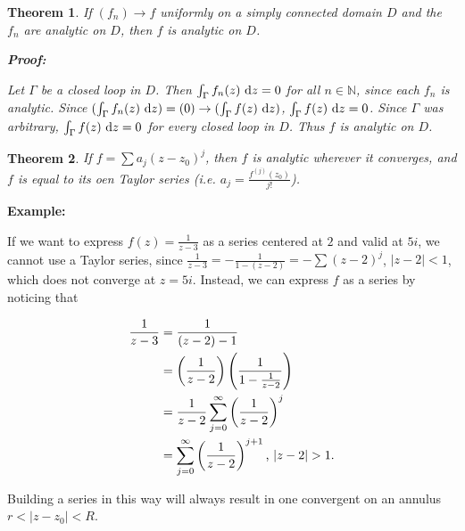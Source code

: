 \documentclass{article}
\theoremstyle{colontheorem}
\newtheorem{theorem}{Theorem}[section]
\newenvironment{Theorem}
{
	\begin{mdframed}[backgroundcolor=TheoremOrange!10]
	\begin{theorem}
}
{
	\end{theorem}
	\end{mdframed}
	
	\vspace{.15in}
}
\newenvironment{Proof}
{
	\begin{mdframed}[backgroundcolor=ProofPurple!10]
	\textbf{Proof:}%
}
{
	\end{mdframed}
	
	\vspace{.085in}
}
\newenvironment{Example}
{
	\begin{mdframed}
	\textbf{Example:}%
}
{
	\end{mdframed}
	
	\vspace{.15in}
}
\begin{document}
\begin{Theorem}
	
	If $(f_n) \to f$ uniformly on a simply connected domain $D$ and the $f_n$ are analytic on $D$, then $f$ is analytic on $D$.
	
	\begin{Proof}
		Let $\Gamma$ be a closed loop in $D$. Then $\int_{\Gamma} f_n(z)\ \textnormal{d}z = 0$ for all $n \in \mathbb{N}$, since each $f_n$ is analytic. Since $(\int_{\Gamma} f_n(z)\ \textnormal{d}z) = (0) \to (\int_{\Gamma} f(z)\ \textnormal{d}z)$, $\int_{\Gamma} f(z)\ \textnormal{d}z = 0$. Since $\Gamma$ was arbitrary, $\int_{\Gamma} f(z)\ \textnormal{d}z = 0$ for every closed loop in $D$. Thus $f$ is analytic on $D$.
		
	\end{Proof}
	
\end{Theorem}



\begin{Theorem}
	
	If $f = \displaystyle\sum a_j (z - z_0)^j$, then $f$ is analytic wherever it converges, and $f$ is equal to its oen Taylor series (i.e. $a_j = \frac{f^{(j)}(z_0)}{j!}$).
	
\end{Theorem}



\begin{Example}
	If we want to express $f(z) = \frac{1}{z-3}$ as a series centered at $2$ and valid at $5i$, we cannot use a Taylor series, since $\frac{1}{z-3} = -\frac{1}{1 - (z-2)} = - \displaystyle\sum (z - 2)^j$, $|z-2| < 1$, which does not converge at $z = 5i$. Instead, we can express $f$ as a series by noticing that
	
	\begin{align*}
		\frac{1}{z-3} &= \frac{1}{(z-2) - 1}\\
		&= \left( \frac{1}{z-2} \right) \left( \frac{1}{1 - \frac{1}{z-2}} \right)\\
		&= \frac{1}{z-2} \sum\limits_{j=0}^\infty \left( \frac{1}{z - 2} \right)^j\\
		&= \sum\limits_{j=0}^\infty \left( \frac{1}{z - 2} \right)^{j + 1}\textnormal{, } |z - 2| > 1.
	\end{align*}
	
	Building a series in this way will always result in one convergent on an annulus $r < |z - z_0| < R$.
	
\end{Example}
\end{document}
